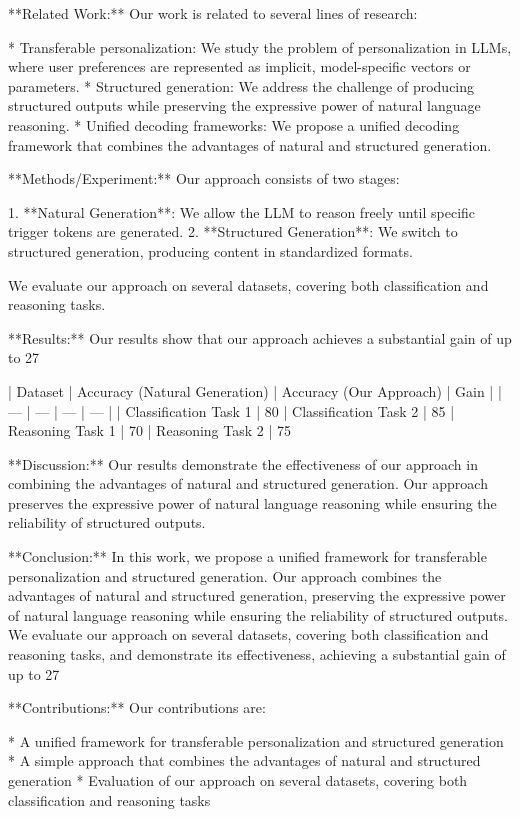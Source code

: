 **Related Work:**
Our work is related to several lines of research:

* Transferable personalization: We study the problem of personalization in LLMs, where user preferences are represented as implicit, model-specific vectors or parameters.
* Structured generation: We address the challenge of producing structured outputs while preserving the expressive power of natural language reasoning.
* Unified decoding frameworks: We propose a unified decoding framework that combines the advantages of natural and structured generation.

**Methods/Experiment:**
Our approach consists of two stages:

1. **Natural Generation**: We allow the LLM to reason freely until specific trigger tokens are generated.
2. **Structured Generation**: We switch to structured generation, producing content in standardized formats.

We evaluate our approach on several datasets, covering both classification and reasoning tasks.

**Results:**
Our results show that our approach achieves a substantial gain of up to 27%

| Dataset | Accuracy (Natural Generation) | Accuracy (Our Approach) | Gain |
| --- | --- | --- | --- |
| Classification Task 1 | 80%
| Classification Task 2 | 85%
| Reasoning Task 1 | 70%
| Reasoning Task 2 | 75%

**Discussion:**
Our results demonstrate the effectiveness of our approach in combining the advantages of natural and structured generation. Our approach preserves the expressive power of natural language reasoning while ensuring the reliability of structured outputs.

**Conclusion:**
In this work, we propose a unified framework for transferable personalization and structured generation. Our approach combines the advantages of natural and structured generation, preserving the expressive power of natural language reasoning while ensuring the reliability of structured outputs. We evaluate our approach on several datasets, covering both classification and reasoning tasks, and demonstrate its effectiveness, achieving a substantial gain of up to 27%

**Contributions:**
Our contributions are:

* A unified framework for transferable personalization and structured generation
* A simple approach that combines the advantages of natural and structured generation
* Evaluation of our approach on several datasets, covering both classification and reasoning tasks

